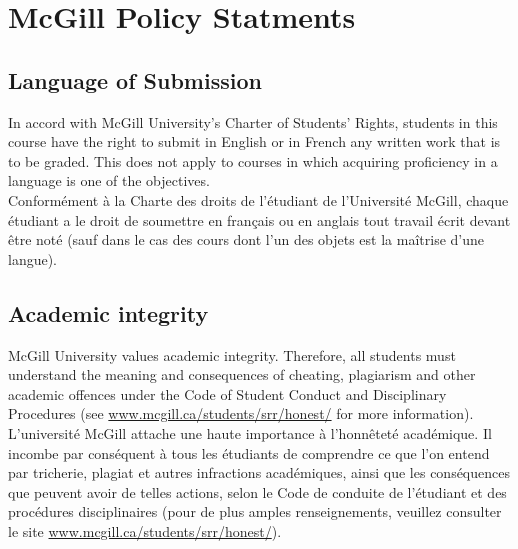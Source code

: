 \documentclass[]{article}
\begin{document}
\section{McGill Policy Statments}


\subsection{Language of Submission}
In accord with McGill University’s Charter of Students' Rights, students in this course have the right to submit in English or in French any written work that is to be graded. This does not apply to courses in which acquiring proficiency in a language is one of the objectives. \\

\noindent Conformément à la Charte des droits de l’étudiant de l’Université McGill, chaque étudiant a le droit de soumettre en français ou en anglais tout travail écrit devant être noté (sauf dans le cas des cours dont l'un des objets est la maîtrise d'une langue).

\subsection{Academic integrity}

McGill University values academic integrity. Therefore, all students must understand the meaning and consequences of cheating, plagiarism and other academic offences under the Code of Student Conduct and Disciplinary Procedures (see \url{www.mcgill.ca/students/srr/honest/} for more information).\\

\noindent L'université McGill attache une haute importance à l’honnêteté académique. Il incombe par conséquent à tous les étudiants de comprendre ce que l'on entend par tricherie, plagiat et autres infractions académiques, ainsi que les conséquences que peuvent avoir de telles actions, selon le Code de conduite de l'étudiant et des procédures disciplinaires (pour de plus amples renseignements, veuillez consulter le site \url{www.mcgill.ca/students/srr/honest/}).
\end{document}
